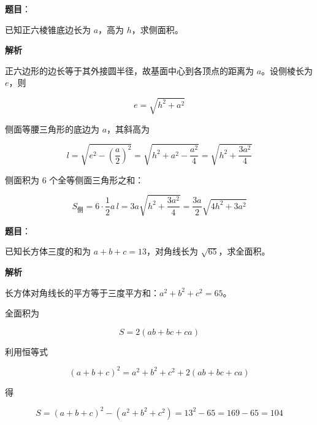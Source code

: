 \begin{answer}

\textbf{题目}：

已知正六棱锥底边长为 $a$，高为 $h$，求侧面积。

\textbf{解析}

正六边形的边长等于其外接圆半径，故基面中心到各顶点的距离为 $a$。设侧棱长为 $e$，则

\nopagebreak[4]
\[
e=\sqrt{h^{2}+a^{2}}
\]

侧面等腰三角形的底边为 $a$，其斜高为

\nopagebreak[4]
\[
l=\sqrt{e^{2}-\left(\frac{a}{2}\right)^{2}}
=\sqrt{h^{2}+a^{2}-\frac{a^{2}}{4}}
=\sqrt{h^{2}+\frac{3a^{2}}{4}}
\]

侧面积为 $6$ 个全等侧面三角形之和：

\nopagebreak[4]
\[
S_{\text{侧}}=6\cdot\frac{1}{2}a\,l
=3a\sqrt{h^{2}+\frac{3a^{2}}{4}}
=\frac{3a}{2}\sqrt{4h^{2}+3a^{2}}
\]


\end{answer}
\begin{answer}

\textbf{题目}：

已知长方体三度的和为 $a+b+c=13$，对角线长为 $\sqrt{65}$，求全面积。

\textbf{解析}

长方体对角线长的平方等于三度平方和：$a^{2}+b^{2}+c^{2}=65$。

全面积为

\nopagebreak[4]
\[
S=2(ab+bc+ca)
\]

利用恒等式

\nopagebreak[4]
\[
(a+b+c)^{2}=a^{2}+b^{2}+c^{2}+2(ab+bc+ca)
\]

得

\nopagebreak[4]
\[
S=(a+b+c)^{2}-(a^{2}+b^{2}+c^{2})=13^{2}-65=169-65=104
\]


\end{answer}
